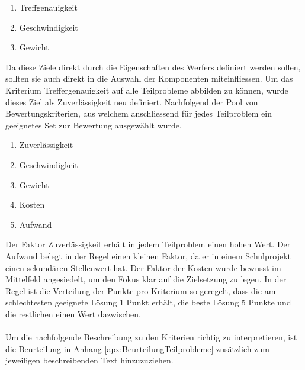 		\begin{enumerate}
			\item Treffgenauigkeit
			\item Geschwindigkeit
			\item Gewicht
		\end{enumerate}		
		Da diese Ziele direkt durch die Eigenschaften des Werfers definiert werden sollen, sollten sie auch direkt in die Auswahl der Komponenten miteinfliessen. Um das Kriterium Treffergenauigkeit auf alle Teilprobleme abbilden zu können, wurde dieses Ziel als Zuverlässigkeit neu definiert. Nachfolgend der Pool von Bewertungskriterien, aus welchem anschliessend für jedes Teilproblem ein geeignetes Set zur Bewertung ausgewählt wurde.
		
		\begin{enumerate}
			\item Zuverlässigkeit
			\item Geschwindigkeit
			\item Gewicht
			\item Kosten
			\item Aufwand
		\end{enumerate}		
		Der Faktor Zuverlässigkeit erhält in jedem Teilproblem einen hohen Wert. Der Aufwand belegt in der Regel einen kleinen Faktor, da er in einem Schulprojekt einen sekundären Stellenwert hat. Der Faktor der Kosten wurde bewusst im Mittelfeld angesiedelt, um den Fokus klar auf die Zielsetzung zu legen.
		In der Regel ist die Verteilung der Punkte pro Kriterium so geregelt, dass die am schlechtesten geeignete Lösung 1 Punkt erhält, die beste Lösung 5 Punkte und die restlichen einen Wert dazwischen.\\
		\\
		Um die nachfolgende Beschreibung zu den Kriterien richtig zu interpretieren, ist die Beurteilung in Anhang \ref{apx:BeurteilungTeilprobleme} zusätzlich zum jeweiligen beschreibenden Text hinzuzuziehen. 
		
